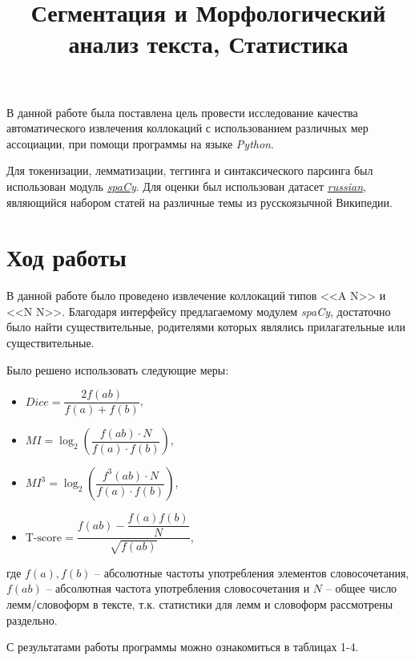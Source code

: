 \documentclass[12pt,a4paper]{article}
\title{Сегментация и Морфологический анализ текста, Статистика}
\begin{document}
	\maketitle
	
	\tableofcontents
	
	\begin{introduction}
		
		В данной работе была поставлена цель провести исследование качества автоматического извлечения коллокаций с использованием различных мер ассоциации, при помощи программы на языке \textit{Python}.
		
		Для токенизации, лемматизации, теггинга и синтаксического парсинга был использован модуль \textit{\href{https://spacy.io/}{spaCy}}. Для оценки был использован датасет \textit{\href{https://huggingface.co/datasets/Den4ikAI/russian_cleared_wikipedia}{russian}}, являющийся набором статей на различные темы из русскоязычной Википедии.
	\end{introduction}
	
	\section{Ход работы}

        В данной работе было проведено извлечение коллокаций типов <<A N>> и <<N N>>. Благодаря интерфейсу предлагаемому модулем \textit{spaCy}, достаточно было найти существительные, родителями которых являлись прилагательные или существительные.
        
        Было решено использовать следующие меры:
        \begin{itemize}
            \item $Dice = \dfrac{2f(ab)}{f(a)+f(b)}$,
            \item $MI = \log_2\left({\dfrac{f(ab)\cdot N}{f(a)\cdot f(b)}}\right)$,
            \item $MI^3 = \log_2\left({\dfrac{f^3(ab)\cdot N}{f(a)\cdot f(b)}}\right)$,
            \item $\text{T-score} = \dfrac{f(ab) - \dfrac{f(a)f(b)}{N}}{\sqrt{f(ab)}}$,
        \end{itemize}
        где $f(a), f(b)$ -- абсолютные частоты употребления элементов словосочетания, $f(ab)$ -- абсолютная частота употребления словосочетания и $N$ -- общее число лемм/словоформ в тексте, т.к. статистики для лемм и словоформ рассмотрены раздельно.
		
		С результатами работы программы можно ознакомиться в таблицах 1-4.
        \newpage
        
\end{document}
